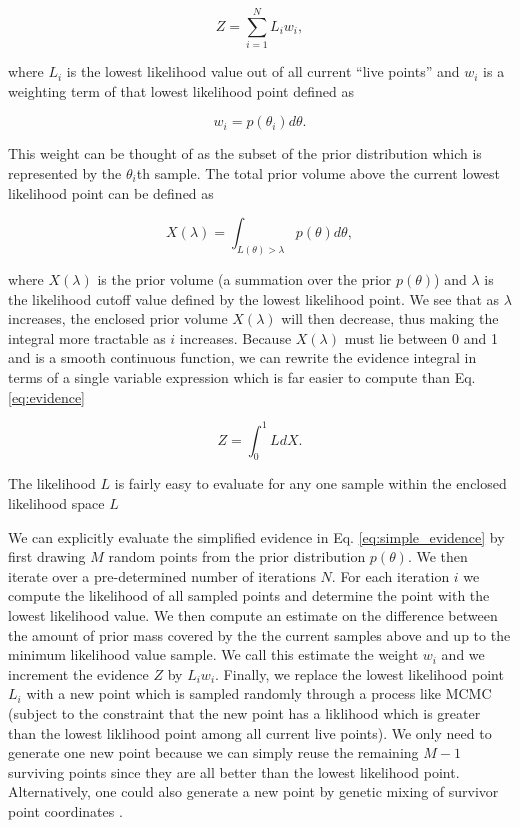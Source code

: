 \begin{equation}
    Z = \sum_{i=1}^{N} L_i w_i,
\end{equation}

where $L_i$ is the lowest likelihood value out of all current ``live points''
and $w_i$ is a weighting term of that lowest likelihood point defined as 

\begin{equation}
    w_i = p(\theta_i) d\theta.
\end{equation}

This weight can be thought of as the subset of the prior distribution 
which is represented by the $\theta_i$th sample. The total prior volume 
above the current lowest likelihood point can be defined as

\begin{equation}
    X(\lambda) = \int_{L(\theta) > \lambda} p(\theta) d\theta,
\end{equation}

where $X(\lambda)$ is the prior volume (a summation over the prior $p(\theta)$) and $\lambda$ is the likelihood cutoff value defined by the lowest likelihood 
point. We see that as $\lambda$ increases, the enclosed prior volume
$X(\lambda)$ will then decrease, thus making the integral more tractable 
as $i$ increases. Because $X(\lambda)$ must lie between 0 and 1 and is a smooth continuous function, we can rewrite the evidence integral in terms of a single variable expression which is far easier to compute than Eq. \ref{eq:evidence}

\begin{equation}
    Z = \int_{0}^{1} L dX. \label{eq:simple_evidence}
\end{equation}

The likelihood $L$ is fairly easy to evaluate for any one sample within the enclosed likelihood space $L$ 

We can explicitly evaluate the simplified evidence in Eq. \ref{eq:simple_evidence} by first drawing $M$ random points from the prior distribution $p(\theta)$. We then iterate over a pre-determined number of iterations $N$. For each iteration $i$ we compute the likelihood of all sampled points and determine the point with the lowest likelihood value. We then compute an estimate on the difference between the amount of prior mass covered by the the current samples above and up to the minimum likelihood value sample. We call this estimate the weight $w_i$ and we increment the evidence $Z$ by $L_i w_i$. Finally, we replace the lowest likelihood point $L_i$ with a new point which is sampled randomly through a process like \ac{MCMC} (subject to the constraint that the 
new point has a liklihood which is greater than the lowest liklihood point among all current live points). We only need to generate one new point because we can simply reuse the remaining $M-1$ surviving points since they are all better than the lowest likelihood point. Alternatively, one could also generate a new point by genetic mixing of survivor point coordinates \cite{skilling2006}.


